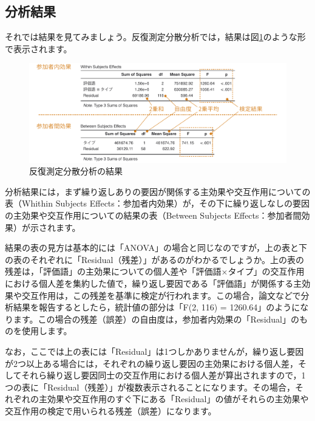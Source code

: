 \documentclass[
  12pt,
  a5jpaper,
  lualatex, ja=standard]{bxjsbook}
\begin{document}
\hypertarget{sub:ANOVA-rm-results}{%
\subsection{分析結果}\label{sub:ANOVA-rm-results}}

それでは結果を見てみましょう。反復測定分散分析では，結果は図\ref{fig:ANOVA-rm-results}のような形で表示されます。

\begin{figure}[!ht]

{\centering \includegraphics[width=1\linewidth]{images/ANOVA/rm-results} 

}

\caption{反復測定分散分析の結果}\label{fig:ANOVA-rm-results}
\end{figure}

分析結果には，まず繰り返しありの要因が関係する主効果や交互作用についての表（Whithin Subjects Effects：参加者内効果）が，その下に繰り返しなしの要因の主効果や交互作用についての結果の表（Between Subjects Effects：参加者間効果）が示されます。

結果の表の見方は基本的には「ANOVA」の場合と同じなのですが，上の表と下の表のそれぞれに「Residual（残差）」があるのがわかるでしょうか。上の表の残差は，「評価語」の主効果についての個人差や「評価語×タイプ」の交互作用における個人差を集約した値で，繰り返し要因である「評価語」が関係する主効果や交互作用は，この残差を基準に検定が行われます。この場合，論文などで分析結果を報告するとしたら，統計値の部分は「F(2, 116) = 1260.64」のようになります。この場合の残差（誤差）の自由度は，参加者内効果の「Residual」のものを使用します。

なお，ここでは上の表には「Residual」は1つしかありませんが，繰り返し要因が2つ以上ある場合には，それぞれの繰り返し要因の主効果における個人差，そしてそれら繰り返し要因同士の交互作用における個人差が算出されますので，1つの表に「Residual（残差）」が複数表示されることになります。その場合，それぞれの主効果や交互作用のすぐ下にある「Residual」の値がそれらの主効果や交互作用の検定で用いられる残差（誤差）になります。
\end{document}
